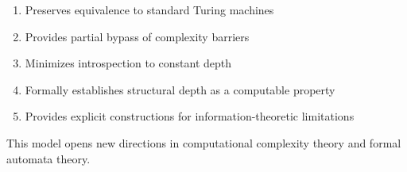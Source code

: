   \begin{enumerate}
  \item Preserves equivalence to standard Turing machines
  \item Provides partial bypass of complexity barriers
  \item Minimizes introspection to constant depth
  \item Formally establishes structural depth as a computable property
  \item Provides explicit constructions for information-theoretic limitations
  \end{enumerate}
  
  This model opens new directions in computational complexity theory and formal automata theory.
  
